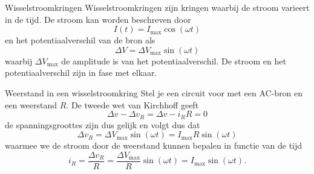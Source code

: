 \begin{theo}[Wisselstroomkringen]{Wisselstroomkringen}
    Wisselstroomkringen zijn kringen waarbij de stroom varieert in de tijd. De stroom kan worden beschreven door
    \begin{equation*}
        I(t) = I_{\max}\cos(\omega t)
    \end{equation*}
    en het potentiaalverschil van de bron als
    \begin{equation*}
        \Delta V = \Delta V_{\max}\sin(\omega t)
    \end{equation*}
    waarbij $\Delta V_{\max}$ de amplitude is van het potentiaalverschil. De stroom en het potentiaalverschil zijn in fase met elkaar.
\end{theo}

\begin{pro}{Weerstand in een wisselstroomkring}
    Stel je een circuit voor met een AC-bron en een weerstand $R$. De tweede wet van Kirchhoff geeft
    \begin{equation*}
        \Delta v - \Delta v_{R} = \Delta v - i_R R = 0
    \end{equation*}
    de spanningsgroottes zijn dus gelijk en volgt dus dat
    \begin{equation*}
        \Delta v_{R} = \Delta V_{\max}\sin(\omega t) = I_{\max}R\sin(\omega t)
    \end{equation*}
    waarmee we de stroom door de weerstand kunnen bepalen in functie van de tijd
    \begin{equation*}
        i_R = \dfrac{\Delta v_{R}}{R} = \dfrac{\Delta V_{\max}}{R}\sin(\omega t) = I_{\max}\sin(\omega t).
    \end{equation*}
    \vspace{-0.5cm}
\end{pro}

\newpage

